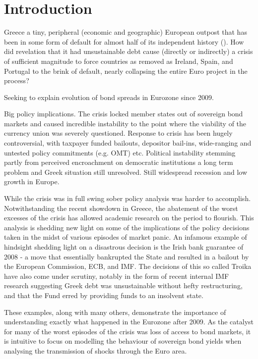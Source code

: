\documentclass[/../base.tex]{subfiles}
\begin{document}
\section{Introduction}
\label{intro}

Greece a tiny, peripheral (economic and geographic) European outpost that has been in some form of default for almost half of its independent history (\cite{kalyvas2015modern}). How did revelation that it had unsustainable debt cause (directly or indirectly) a crisis of sufficient magnitude to force countries as removed as Ireland, Spain, and Portugal to the brink of default, nearly collapsing the entire Euro project in the process? 

Seeking to explain evolution of bond spreads in Eurozone since 2009.

\cite{whelan2013sovereign}

Big policy implications. The crisis locked member states out of sovereign bond markets and caused incredible instability to the point where the viability of the currency union was severely questioned. Response to crisis has been hugely controversial, with taxpayer funded bailouts, depositor bail-ins, wide-ranging and untested policy commitments (e.g. OMT) etc. Political instability stemming partly from perceived encroachment on democratic institutions a long term problem and Greek situation still unresolved. Still widespread recession and low growth in Europe.  

While the crisis was in full swing sober policy analysis was harder to accomplish. Notwithstanding the recent showdown in Greece, the abatement of the worst excesses of the crisis has allowed academic research on the period to flourish. This analysis is shedding new light on some of the implications of the policy decisions taken in the midst of various episodes of market panic. An infamous example of hindsight shedding light on a disastrous decision is the Irish bank guarantee of 2008 - a move that essentially bankrupted the State and resulted in a bailout by the European Commission, ECB, and IMF. The decisions of this so called Troika have also come under scrutiny, notably in the form of recent internal IMF research suggesting Greek debt was unsustainable without hefty restructuring, and that the Fund erred by providing funds to an insolvent state. 

These examples, along with many others, demonstrate the importance of understanding exactly what happened in the Eurozone after 2009. As the catalyst for many of the worst episodes of the crisis was loss of access to bond markets, it is intuitive to focus on modelling the behaviour of sovereign bond yields when analysing the transmission of shocks through the Euro area. 
\end{document}
